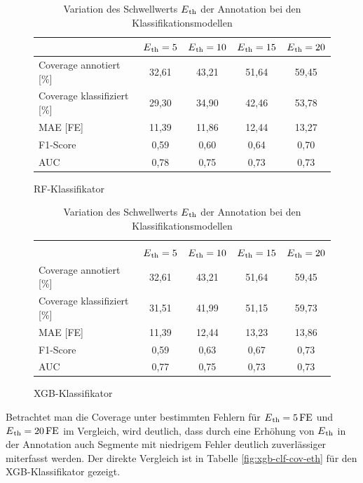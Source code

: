 \begin{table}[H]
	\begin{subfigure}{\textwidth}
	\centering
	\begin{tabular}{l || c | c | c | c}
								& $E\textsubscript{th}=5$	& $E\textsubscript{th}=10$	& $E\textsubscript{th}=15$	& $E\textsubscript{th}=20$	\\ \hline
	Coverage annotiert [\%]		& 32,61						& 43{,}21 					& 51,64						& 59,45\\
 	Coverage klassifiziert [\%]	& 29,30						& 34,90 					& 42,46						& 53,78\\
 	\ac{MAE} [FE]				& 11,39						& 11,86						& 12,44						& 13,27\\
 	F1-Score 					& 0,59						& 0,60						& 0,64						& 0,70\\
 	AUC 						& 0,78						& 0,75						& 0,73						& 0,73\\
 	\end{tabular}	
	\caption{\ac{RF}-Klassifikator}
	\end{subfigure}
	\begin{subfigure}{\textwidth}
	\centering
	\begin{tabular}{l || c | c | c | c}
	\multicolumn{5}{l}{	}	\\
								& $E\textsubscript{th}=5$	& $E\textsubscript{th}=10$	& $E\textsubscript{th}=15$	& $E\textsubscript{th}=20$	\\ \hline
	Coverage annotiert [\%]		& 32,61						& 43{,}21 					& 51,64						& 59,45\\
 	Coverage klassifiziert [\%]	& 31,51						& 41,99 					& 51,15						& 59,73\\
 	\ac{MAE} [FE]				& 11,39						& 12,44						& 13,23						& 13,86\\
 	F1-Score 					& 0,59						& 0,63						& 0,67						& 0,73\\
 	AUC 						& 0,77						& 0,75						& 0,73						& 0,73\\
 	\end{tabular}	
	\caption{\ac{XGB}-Klassifikator}
	\end{subfigure}
	\caption{Variation des Schwellwerts $E\textsubscript{th}$ der Annotation bei den Klassifikationsmodellen}
	\label{fig:var-eth-clf}
\end{table}

Betrachtet man die Coverage unter bestimmten Fehlern für $E\textsubscript{th}= 5\text{\,}\si{FE}$ und $E\textsubscript{th}= 20\text{\,}\si{FE}$ im Vergleich, wird deutlich, dass durch eine Erhöhung von $E\textsubscript{th}$ in der Annotation auch Segmente mit niedrigem Fehler deutlich zuverlässiger miterfasst werden. Der direkte Vergleich ist in Tabelle \ref{fig:xgb-clf-cov-eth} für den \ac{XGB}-Klassifikator gezeigt.

